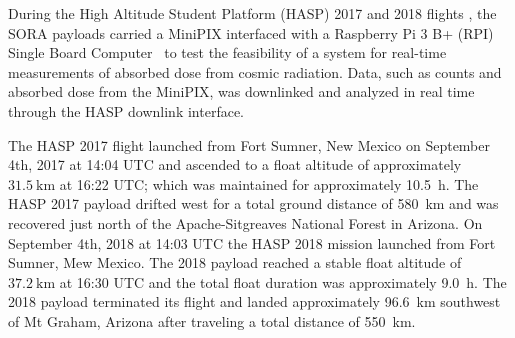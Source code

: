 During the High Altitude Student Platform (HASP) 2017 and 2018 flights \cite{hasp}, the SORA payloads carried a MiniPIX interfaced with a Raspberry Pi 3 B+ (RPI) Single Board Computer~\cite{rpi} to test the feasibility of a system for real-time measurements of absorbed dose from cosmic radiation. Data, such as counts and absorbed dose from the MiniPIX, was downlinked and analyzed in real time through the HASP downlink interface. 

The HASP 2017 flight launched from Fort Sumner, New Mexico on September 4th, 2017 at 14:04 UTC and ascended to a float altitude of approximately $\SI{31.5}{\kilo\meter}$ at 16:22 UTC; which was maintained for approximately \SI{10.5}{\hour}. The HASP 2017 payload drifted west for a total ground distance of \SI{580}{\kilo\meter} and was recovered just north of the Apache-Sitgreaves National Forest in Arizona.  On September 4th, 2018 at 14:03 UTC the HASP 2018 mission launched from Fort Sumner, Mew Mexico.  The 2018 payload reached a stable float altitude of $\SI{37.2}{\kilo\meter}$ at 16:30 UTC and the total float duration was approximately \SI{9.0}{\hour}. The 2018 payload terminated its flight and landed approximately \SI{96.6}{\kilo\meter} southwest of Mt Graham, Arizona after traveling a total distance of \SI{550}{\kilo\meter}.

